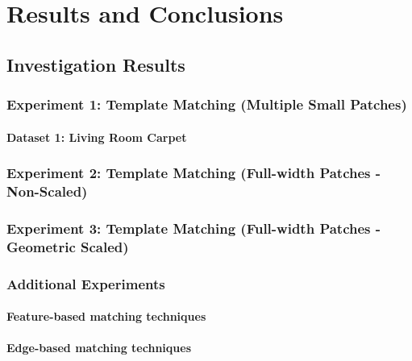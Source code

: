 \chapter{Results and Conclusions}

%
%
%

\section{Investigation Results}

\subsection{Experiment 1: Template Matching (Multiple Small Patches)}

\subsubsection{Dataset 1: Living Room Carpet}

\subsection{Experiment 2: Template Matching (Full-width Patches - Non-Scaled)}
\subsection{Experiment 3: Template Matching (Full-width Patches - Geometric Scaled)}

\subsection{Additional Experiments}

\subsubsection{Feature-based matching techniques}

\subsubsection{Edge-based matching techniques}